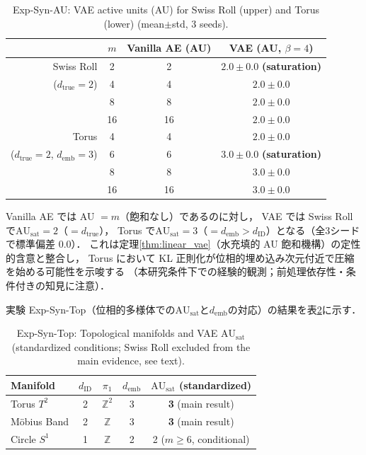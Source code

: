 \documentclass[11pt,a4paper]{jsarticle}
\newcommand{\dID}{d_{\mathrm{ID}}}
\newcommand{\dtrue}{d_{\mathrm{true}}}
\newcommand{\AUsat}{\mathrm{AU}_{\mathrm{sat}}}
\newcommand{\demb}{d_{\mathrm{emb}}}
\begin{document}
\begin{table}[H]
\centering
\caption{Exp-Syn-AU: VAE active units (AU) for Swiss Roll (upper) and Torus (lower) (mean$\pm$std, 3 seeds).}
\label{tab:ea_summary}
\small
\begin{tabular}{rccc}
\toprule
 & $m$ & Vanilla AE (AU) & VAE (AU, $\beta=4$) \\
\midrule
Swiss Roll & 2 & 2 & $2.0\pm0.0$ \textbf{(saturation)} \\
($d_\mathrm{true}=2$) & 4 & 4 & $2.0\pm0.0$ \\
 & 8 & 8 & $2.0\pm0.0$ \\
 & 16 & 16 & $2.0\pm0.0$ \\
\midrule
Torus & 4 & 4 & $2.0\pm0.0$ \\
($d_\mathrm{true}=2$, $d_\mathrm{emb}=3$) & 6 & 6 & $3.0\pm0.0$ \textbf{(saturation)} \\
 & 8 & 8 & $3.0\pm0.0$ \\
 & 16 & 16 & $3.0\pm0.0$ \\
\bottomrule
\end{tabular}
\end{table}

Vanilla AE では AU $= m$（飽和なし）であるのに対し，
VAE では Swiss Roll で$\AUsat = 2$（$= \dtrue$），
Torus で$\AUsat = 3$（$= \demb > \dID$）となる（全3シードで標準偏差 0.0）．
これは定理\ref{thm:linear_vae}（水充填的 AU 飽和機構）の定性的含意と整合し，
Torus において KL 正則化が位相的埋め込み次元付近で圧縮を始める可能性を示唆する
（本研究条件下での経験的観測；前処理依存性・条件付きの知見に注意）．

実験 Exp-Syn-Top（位相的多様体での$\AUsat$と$\demb$の対応）の結果を表\ref{tab:eb_summary}に示す．

\begin{table}[H]
\centering
\caption{Exp-Syn-Top: Topological manifolds and VAE $\AUsat$ (standardized conditions; Swiss Roll excluded from the main evidence, see text).}
\label{tab:eb_summary}
\small
\begin{tabular}{lcccc}
\toprule
Manifold & $\dID$ & $\pi_1$ & $\demb$ & $\AUsat$ (standardized) \\
\midrule
Torus $T^2$  & 2 & $\mathbb{Z}^2$ & 3 & \textbf{3} (main result) \\
Möbius Band  & 2 & $\mathbb{Z}$   & 3 & \textbf{3} (main result) \\
Circle $S^1$ & 1 & $\mathbb{Z}$   & 2 & 2 ($m \geq 6$, conditional) \\
\bottomrule
\end{tabular}
\end{table}
\end{document}
